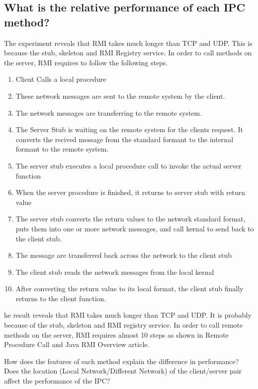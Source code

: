 \documentclass{article}
\begin{document}
\subsection{What is the relative performance of each IPC method?} 
The experiment reveals that RMI takes much longer than TCP and UDP. This is because the stub, skeleton and RMI Registry service. In order to call methods on the server, RMI requires to follow the following steps.
\begin{enumerate}
\item Client Calls a local procedure
\item These network messages are sent to the remote system by the client.
\item The network messages are transferring to the remote system.
\item The Server Stub is waiting on the remote system for the clients request. It converts the recived message from the standard formant to the internal formant to the remote system.
\item The server stub executes a local procedure call to invoke the actual server function
\item When the server procedure is finished, it returns to server stub with return value
\item The server stub converts the return values to the network standard format, puts them into one or more network messages, and call kernal to send back to the client stub.
\item The message are transferred back across the network to the client stub
\item The client stub reads the network messages from the local kernal
\item After converting the return value to its local format, the client stub finally returns to the client function.
\end{enumerate}


he result reveals that RMI takes much longer than TCP and UDP. It is probably because of the stub, skeleton and RMI registry service. In order to call remote methods on the server, RMI requires almost 10 steps as shown in Remote Procedure Call and Java RMI Overview article.


How does the features of each method explain the difference in performance? \\


Does the location (Local Network/Different Network) of the client/server pair affect the performance of the IPC? \\
\end{document}
